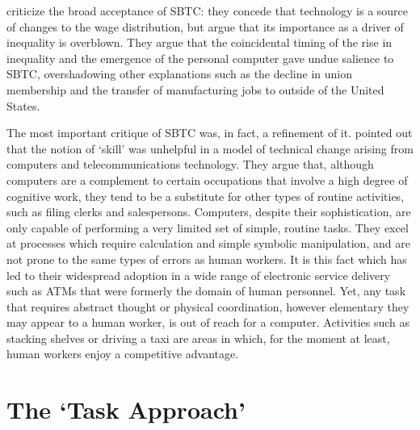 \citet{Card2002} criticize the broad acceptance of SBTC: they concede that technology is a source of changes to the wage distribution, but argue that its importance as a driver of inequality is overblown. They argue that the coincidental timing of the rise in inequality and the emergence of the personal computer gave undue salience to SBTC, overshadowing other explanations such as the decline in union membership and the transfer of manufacturing jobs to outside of the United States.

The most important critique of SBTC was, in fact, a refinement of it. \citet{Levy2003} pointed out that the notion of `skill' was unhelpful in a model of technical change arising from computers and telecommunications technology. They argue that, although computers are a complement to certain occupations that involve a high degree of cognitive work, they tend to be a substitute for other types of routine activities, such as filing clerks and salespersons. Computers, despite their sophistication, are only capable of performing a very limited set of simple, routine tasks. They excel at processes which require calculation and simple symbolic manipulation, and are not prone to the same types of errors as human workers. It is this fact which has led to their widespread adoption in a wide range of electronic service delivery such as ATMs that were formerly the domain of human personnel. Yet, any task that requires abstract thought or physical coordination, however elementary they may appear to a human worker, is out of reach for a computer. Activities such as stacking shelves or driving a taxi are areas in which, for the moment at least, human workers enjoy a competitive advantage. 

\section{The `Task Approach'}

